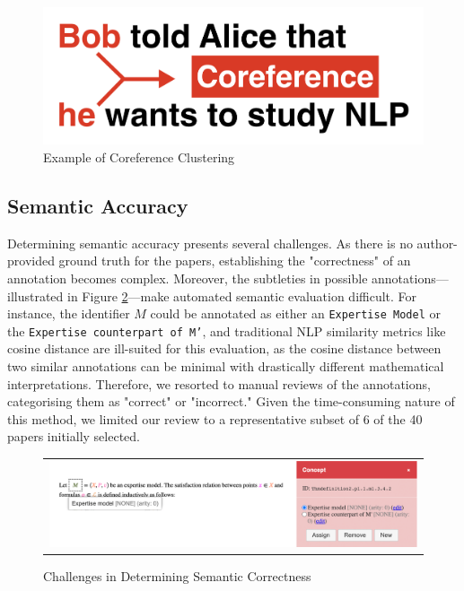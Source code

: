 \begin{figure}[htpb]
  \centering
  \begin{minipage}{\textwidth}
    \centering
    \includegraphics[width=14cm]{images/coreference.png}
    \caption[Example for coreference]{Example of Coreference Clustering \citep{asakura2022building}\footnotemark}
    \label{fig:coreference}
  \end{minipage}
\end{figure}

\subsection{Semantic Accuracy}

Determining semantic accuracy presents several challenges. As there is no author-provided ground truth for the papers, establishing the "correctness" of an annotation becomes complex. Moreover, the subtleties in possible annotations—illustrated in Figure \ref{fig:semantic-incorrectness}—make automated semantic evaluation difficult. For instance, the identifier $\mathbf{}{M}$ could be annotated as either an \texttt{Expertise Model} or the \texttt{Expertise counterpart of M'}, and traditional NLP similarity metrics like cosine distance are ill-suited for this evaluation, as the cosine distance between two similar annotations can be minimal with drastically different mathematical interpretations. Therefore, we resorted to manual reviews of the annotations, categorising them as "correct" or "incorrect." Given the time-consuming nature of this method, we limited our review to a representative subset of 6 of the 40 papers initially selected.

\begin{figure}[htpb]
  \centering
  \begin{tabular}{c}
    \includegraphics[width=14cm]{images/semantic-incorrectness.png}
  \end{tabular}
  \caption[Semantic Correctness]{Challenges in Determining Semantic Correctness}\label{fig:semantic-incorrectness}
\end{figure}
